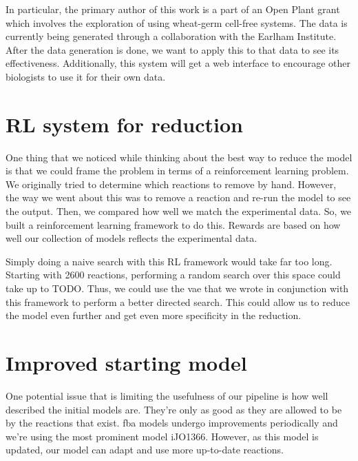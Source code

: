 In particular, the primary author of this work is a part of an Open Plant grant which involves the exploration of using wheat-germ cell-free systems.
The data is currently being generated through a collaboration with the Earlham Institute.
After the data generation is done, we want to apply this to that data to see its effectiveness.
Additionally, this system will get a web interface to encourage other biologists to use it for their own data.

\section{RL system for reduction}
One thing that we noticed while thinking about the best way to reduce the model is that we could frame the problem in terms of a reinforcement learning problem.
We originally tried to determine which reactions to remove by hand.
However, the way we went about this was to remove a reaction and re-run the model to see the output.
Then, we compared how well we match the experimental data.
So, we built a reinforcement learning framework to do this.
Rewards are based on how well our collection of models reflects the experimental data.

Simply doing a naive search with this RL framework would take far too long.
Starting with 2600 reactions, performing a random search over this space could take up to TODO.
Thus, we could use the \gls{vae} that we wrote in conjunction with this framework to perform a better directed search.
This could allow us to reduce the model even further and get even more specificity in the reduction.

\section{Improved starting model}
One potential issue that is limiting the usefulness of our pipeline is how well described the initial models are.
They're only as good as they are allowed to be by the reactions that exist.
\gls{fba} models undergo improvements periodically and we're using the most prominent model iJO1366.
However, as this model is updated, our model can adapt and use more up-to-date reactions.

